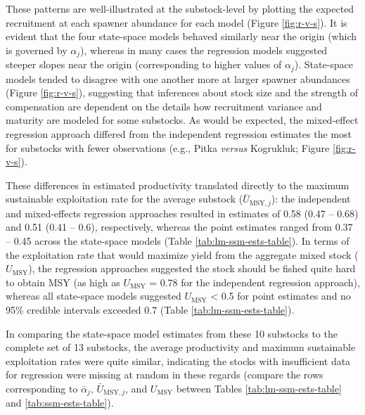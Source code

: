 \documentclass[12pt,]{book}
\theoremstyle{definition}
\theoremstyle{definition}
\theoremstyle{definition}
\theoremstyle{remark}
\begin{document}
These patterns are well-illustrated at the substock-level by plotting
the expected recruitment at each spawner abundance for each model
(Figure \ref{fig:r-v-s}). It is evident that the four state-space models
behaved similarly near the origin (which is governed by \(\alpha_j\)),
whereas in many cases the regression models suggested steeper slopes
near the origin (corresponding to higher values of \(\alpha_j\)).
State-space models tended to disagree with one another more at larger
spawner abundances (Figure \ref{fig:r-v-s}), suggesting that inferences
about stock size and the strength of compensation are dependent on the
details how recruitment variance and maturity are modeled for some
substocks. As would be expected, the mixed-effect regression approach
differed from the independent regression estimates the most for
substocks with fewer observations (e.g., Pitka \emph{versus} Kogrukluk;
Figure \ref{fig:r-v-s}).

These differences in estimated productivity translated directly to the
maximum sustainable exploitation rate for the average substock
(\(\bar{U}_{\text{MSY},j}\)): the independent and mixed-effects
regression approaches resulted in estimates of 0.58 (0.47 -- 0.68) and
0.51 (0.41 -- 0.6), respectively, whereas the point estimates ranged
from 0.37 -- 0.45 across the state-space models (Table
\ref{tab:lm-ssm-ests-table}). In terms of the exploitation rate that
would maximize yield from the aggregate mixed stock
(\(U_{\text{MSY}}\)), the regression approaches suggested the stock
should be fished quite hard to obtain MSY (as high as \(U_{\text{MSY}}\)
= 0.78 for the independent regression approach), whereas all state-space
models suggested \(U_{\text{MSY}}\) \textless{} 0.5 for point estimates
and no 95\% credible intervals exceeded 0.7 (Table
\ref{tab:lm-ssm-ests-table}).

In comparing the state-space model estimates from these 10 substocks to
the complete set of 13 substocks, the average productivity and maximum
sustainable exploitation rates were quite similar, indicating the stocks
with insufficient data for regression were missing at random in these
regards (compare the rows corresponding to \(\bar{\alpha}_j\),
\(\bar{U}_{\text{MSY},j}\), and \(U_{\text{MSY}}\) between Tables
\ref{tab:lm-ssm-ests-table} and \ref{tab:ssm-ests-table}).
\end{document}
